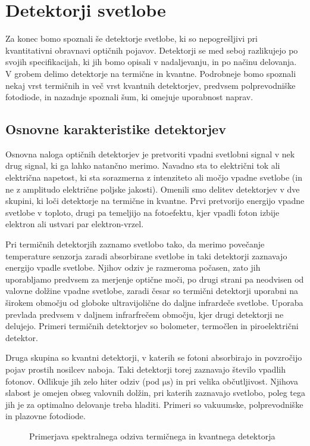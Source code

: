 
\chapter{Detektorji svetlobe}

Za konec bomo spoznali še detektorje svetlobe, ki so nepogrešljivi
pri kvantitativni obravnavi optičnih pojavov. Detektorji se med seboj razlikujejo
po svojih specifikacijah, ki jih bomo opisali v nadaljevanju, in po načinu delovanja. 
V grobem delimo detektorje na termične in kvantne. Podrobneje bomo spoznali nekaj vrst
termičnih in več vrst kvantnih detektorjev, predvsem polprevodniške fotodiode, in 
nazadnje spoznali šum, ki omejuje uporabnost naprav.

\section{Osnovne karakteristike detektorjev}

Osnovna naloga optičnih detektorjev je pretvoriti vpadni svetlobni signal 
v nek drug signal, ki ga lahko natančno merimo. Navadno sta to električni tok 
ali električna napetost, ki sta sorazmerna z intenziteto ali močjo vpadne svetlobe 
(in ne z amplitudo električne poljske jakosti). Omenili smo delitev detektorjev v dve skupini, 
ki loči detektorje na termične in kvantne. Prvi pretvorijo energijo vpadne svetlobe 
v toploto, drugi pa temeljijo na fotoefektu, kjer vpadli foton izbije elektron ali 
ustvari par elektron-vrzel.

Pri termičnih detektorjih zaznamo svetlobo tako,
da merimo povečanje temperature senzorja zaradi absorbirane svetlobe in taki detektorji
zaznavajo energijo vpadle svetlobe. Njihov odziv je razmeroma počasen, zato jih uporabljamo
predvsem za merjenje optične moči, po drugi strani pa neodvisen
od valovne dolžine vpadne svetlobe, zaradi česar so termični detektorji uporabni na 
širokem območju od globoke ultravijolične do daljne infrardeče svetlobe. Uporaba
prevlada predvsem v daljnem infrarfrečem območju, kjer drugi detektorji ne delujejo.
Primeri termičnih detektorjev so bolometer, termočlen in piroelektrični detektor.

Druga skupina so kvantni detektorji, v katerih se
fotoni absorbirajo in povzročijo pojav prostih nosilcev naboja. Taki detektorji
torej zaznavajo število vpadlih fotonov. Odlikuje jih zelo hiter odziv (pod $\si{\micro\second}$)
in pri velika občutljivost. Njihova slabost je omejen obseg valovnih dolžin,
pri katerih zaznavajo svetlobo, poleg tega jih je za optimalno delovanje treba 
hladiti. Primeri so vakuumske, polprevodniške in plazovne fotodiode.
\begin{figure}[h]
\centering
\def\svgwidth{65truemm} 

\caption{Primerjava spektralnega odziva termičnega in kvantnega detektorja}
\label{fig:shemaTermKv}
\end{figure}

